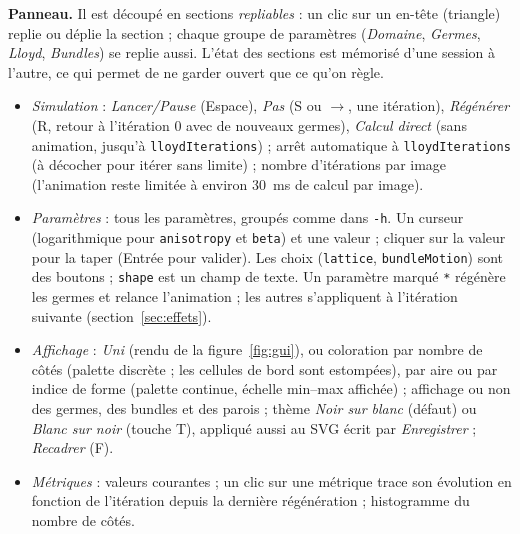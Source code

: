 \documentclass[10pt,a4paper]{article}
\newcommand{\code}[1]{\texttt{#1}}
\begin{document}
\textbf{Panneau.} Il est découpé en sections \emph{repliables} : un clic sur un en-tête (triangle) replie ou
déplie la section ; chaque groupe de paramètres (\emph{Domaine}, \emph{Germes}, \emph{Lloyd}, \emph{Bundles}) se
replie aussi. L'état des sections est mémorisé d'une session à l'autre, ce qui permet de ne garder ouvert que ce
qu'on règle.
\begin{itemize}
  \item \emph{Simulation} : \emph{Lancer/Pause} (Espace), \emph{Pas} (S ou $\rightarrow$, une itération),
    \emph{Régénérer} (R, retour à l'itération 0 avec de nouveaux germes), \emph{Calcul direct} (sans animation,
    jusqu'à \code{lloydIterations}) ; arrêt automatique à \code{lloydIterations} (à décocher pour itérer sans
    limite) ; nombre d'itérations par image (l'animation reste limitée à environ 30~ms de calcul par image).
  \item \emph{Paramètres} : tous les paramètres, groupés comme dans \code{-h}. Un curseur (logarithmique pour
    \code{anisotropy} et \code{beta}) et une valeur ; cliquer sur la valeur pour la taper (Entrée pour valider).
    Les choix (\code{lattice}, \code{bundleMotion}) sont des boutons ; \code{shape} est un champ de texte. Un
    paramètre marqué \code{*} régénère les germes et relance l'animation ; les autres s'appliquent à l'itération
    suivante (section~\ref{sec:effets}).
  \item \emph{Affichage} : \emph{Uni} (rendu de la figure~\ref{fig:gui}), ou coloration par nombre de côtés
    (palette discrète ; les cellules de bord sont estompées), par aire ou par indice de forme (palette continue,
    échelle min--max affichée) ; affichage ou non des germes, des bundles et des parois ; thème \emph{Noir sur blanc} (défaut) ou \emph{Blanc sur noir} (touche T), appliqué
    aussi au SVG écrit par \emph{Enregistrer} ; \emph{Recadrer} (F).
  \item \emph{Métriques} : valeurs courantes ; un clic sur une métrique trace son évolution en fonction de
    l'itération depuis la dernière régénération ; histogramme du nombre de côtés.
\end{itemize}
\end{document}
